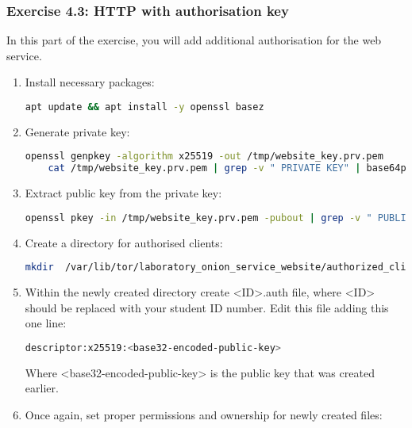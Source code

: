 \subsubsection{Exercise 4.3: HTTP with authorisation key}
In this part of the exercise, you will add additional authorisation for the web service.
\begin{enumerate}
    \item Install necessary packages:
    \begin{lstlisting}[language=bash]
    apt update && apt install -y openssl basez
    \end{lstlisting}
    \item Generate private key:
    \begin{lstlisting}[language=bash, breaklines=true, breakatwhitespace=true, showstringspaces=false]
    openssl genpkey -algorithm x25519 -out /tmp/website_key.prv.pem
    cat /tmp/website_key.prv.pem | grep -v " PRIVATE KEY" | base64pem -d | tail --bytes=32 | base32 | sed 's/=//g' > /tmp/website_key.prv.key
    \end{lstlisting}
    \item Extract public key from the private key:
    \begin{lstlisting}[language=bash, breaklines=true, breakatwhitespace=true, showstringspaces=false]
    openssl pkey -in /tmp/website_key.prv.pem -pubout | grep -v " PUBLIC KEY" | base64pem -d | tail --bytes=32 | base32 | sed 's/=//g' > /tmp/website_key.pub.key
    \end{lstlisting}
    \item Create a directory for authorised clients:
    \begin{lstlisting}[language=bash, breaklines=true, breakatwhitespace=true, columns=flexible]
    mkdir  /var/lib/tor/laboratory_onion_service_website/authorized_clients/
    \end{lstlisting}
    \item Within the newly created directory create <ID>.auth file, where <ID> should be replaced with your student ID number. Edit this file adding this one line:
    \begin{lstlisting}[language=bash]
    descriptor:x25519:<base32-encoded-public-key>
    \end{lstlisting}
    Where <base32-encoded-public-key> is the public key that was created earlier.
    \item Once again, set proper permissions and ownership for newly created files:
    \begin{lstlisting}[language=bash]

\end{lstlisting}
\end{enumerate}
